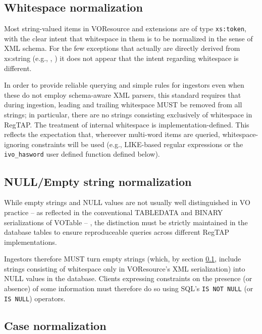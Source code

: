 \documentclass[11pt,a4paper]{ivoa}
\newcommand{\rtent}[1]{\texttt{\color{rtcolor} #1}}
\begin{document}
\subsection{Whitespace normalization}

\label{whitenorm}

Most string-valued items in VOResource and extensions are of type
\texttt{xs:to\-ken}, with the clear intent that whitespace in them is
to be normalized in the sense of XML schema.  For the few exceptions
that actually are directly derived from xs:string (e.g.,
, ) it does not
appear that the intent regarding whitespace is different.

In order to provide reliable querying and simple rules for ingestors
even when these do not employ schema-aware XML parsers, this standard
requires that during ingestion, leading and trailing whitespace MUST be
removed from all strings; in particular, there are no strings consisting
exclusively of whitespace in RegTAP.  The treatment of internal
whitespace is implementation-defined. This reflects the expectation
that, whereever multi-word items are queried, whitespace-ignoring
constraints will be used (e.g., LIKE-based regular expressions or the
\rtent{ivo\_hasword} user defined function defined below).


\subsection{NULL/Empty string normalization}

\label{nullnorm}

While empty strings and NULL values are not usually well
distinguished in VO practice -- as reflected in the conventional
TABLEDATA and BINARY serializations of VOTable -- , the distinction
must be strictly maintained in the database tables to ensure
reproduceable queries across different RegTAP implementations.

Ingestors therefore MUST turn empty strings (which, by section \ref{whitenorm}, include strings consisting of whitespace
only in VOResource's XML serialization) into NULL values in the
database.  Clients expressing constraints on the presence (or absence)
of some information must therefore do so using SQL's \texttt{IS NOT NULL}
(or \texttt{IS NULL}) operators.


\subsection{Case normalization}
\end{document}
